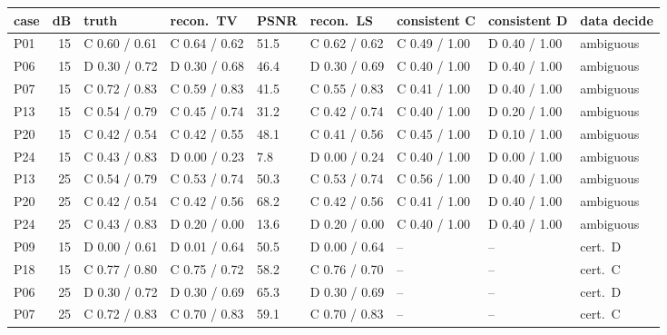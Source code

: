 \begin{tabular}{@{}lr lll l ll l@{}}\toprule
case & dB & truth & recon.\ TV & PSNR & recon.\ LS & consistent C & consistent D & data decide\\\midrule
P01 & 15 & C 0.60 / 0.61 & C 0.64 / 0.62 & 51.5 & C 0.62 / 0.62 & C 0.49 / 1.00 & D 0.40 / 1.00 & ambiguous\\
P06 & 15 & D 0.30 / 0.72 & D 0.30 / 0.68 & 46.4 & D 0.30 / 0.69 & C 0.40 / 1.00 & D 0.40 / 1.00 & ambiguous\\
P07 & 15 & C 0.72 / 0.83 & C 0.59 / 0.83 & 41.5 & C 0.55 / 0.83 & C 0.41 / 1.00 & D 0.40 / 1.00 & ambiguous\\
P13 & 15 & C 0.54 / 0.79 & C 0.45 / 0.74 & 31.2 & C 0.42 / 0.74 & C 0.40 / 1.00 & D 0.20 / 1.00 & ambiguous\\
P20 & 15 & C 0.42 / 0.54 & C 0.42 / 0.55 & 48.1 & C 0.41 / 0.56 & C 0.45 / 1.00 & D 0.10 / 1.00 & ambiguous\\
P24 & 15 & C 0.43 / 0.83 & D 0.00 / 0.23 & 7.8 & D 0.00 / 0.24 & C 0.40 / 1.00 & D 0.00 / 1.00 & ambiguous\\
P13 & 25 & C 0.54 / 0.79 & C 0.53 / 0.74 & 50.3 & C 0.53 / 0.74 & C 0.56 / 1.00 & D 0.40 / 1.00 & ambiguous\\
P20 & 25 & C 0.42 / 0.54 & C 0.42 / 0.56 & 68.2 & C 0.42 / 0.56 & C 0.41 / 1.00 & D 0.40 / 1.00 & ambiguous\\
P24 & 25 & C 0.43 / 0.83 & D 0.20 / 0.00 & 13.6 & D 0.20 / 0.00 & C 0.40 / 1.00 & D 0.40 / 1.00 & ambiguous\\
P09 & 15 & D 0.00 / 0.61 & D 0.01 / 0.64 & 50.5 & D 0.00 / 0.64 & -- & -- & cert.\ D\\
P18 & 15 & C 0.77 / 0.80 & C 0.75 / 0.72 & 58.2 & C 0.76 / 0.70 & -- & -- & cert.\ C\\
P06 & 25 & D 0.30 / 0.72 & D 0.30 / 0.69 & 65.3 & D 0.30 / 0.69 & -- & -- & cert.\ D\\
P07 & 25 & C 0.72 / 0.83 & C 0.70 / 0.83 & 59.1 & C 0.70 / 0.83 & -- & -- & cert.\ C\\
\bottomrule\end{tabular}
